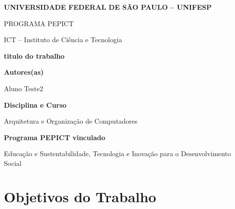 \documentclass[12pt,a4paper]{article}
\begin{document}

\begin{center}

{\large \textbf{UNIVERSIDADE FEDERAL DE SÃO PAULO -- UNIFESP}}

\vspace{0.3cm}

{\normalsize PROGRAMA PEPICT}

\vspace{0.3cm}

{\normalsize ICT -- Instituto de Ciência e Tecnologia}

\vspace{1cm}

{\Large \textbf{titulo do trabalho}}

\end{center}

\vspace{1cm}


\noindent
\textbf{Autores(as)}

Aluno Teste2

\vspace{0.7cm}


\noindent
\textbf{Disciplina e Curso}

Arquitetura e Organização de Computadores

\vspace{0.7cm}


\noindent
\textbf{Programa PEPICT vinculado}

Educação e Sustentabilidade, Tecnologia e Inovação para o Desenvolvimento Social

\vspace{0.7cm}


\section*{Objetivos do Trabalho}
\end{document}
